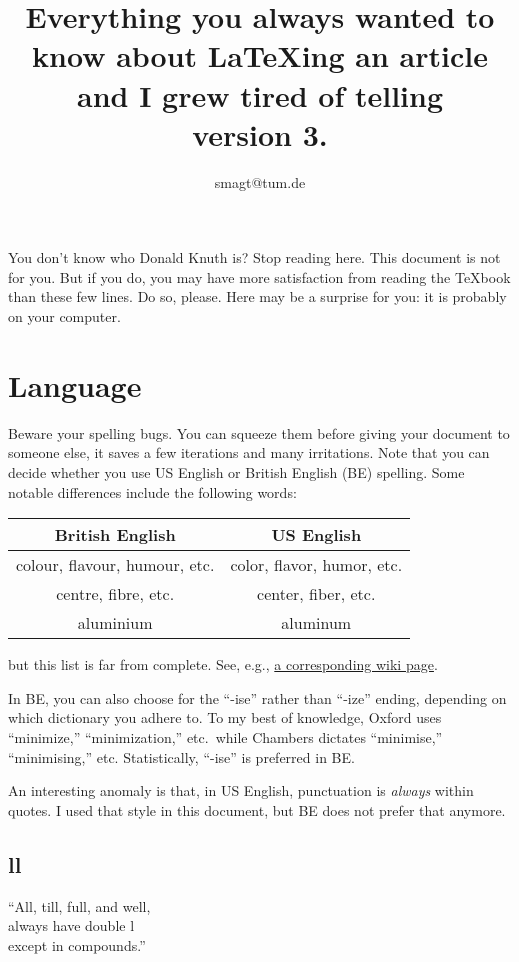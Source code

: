 \documentclass{article}
\title{Everything you always wanted to know about \LaTeX ing an article and I grew tired of telling\\[1ex]
\footnotesize{version 3.}}
\author{smagt@tum.de}
\begin{document}
\maketitle

You don't know who Donald Knuth is?  Stop reading here.  This document is not for you.  But if you do,
you may have more satisfaction from reading the \TeX book than these few lines.   Do so, please.
Here may be a surprise for you: it is probably on your computer.

\section{Language}
Beware your spelling bugs.  You can squeeze them before giving your document to someone else, it saves
a few iterations and many irritations.  Note that you can decide whether you use US English or
British English (BE) spelling.  Some notable differences include the following words:
\begin{center}\begin{tabular}{c|c}
British English & US English \\\hline
colour, flavour, humour, etc.	& color, flavor, humor, etc.\\
centre, fibre, etc.	& center, fiber, etc.\\
aluminium			& aluminum
\end{tabular}\end{center}
but this list is far from complete.  See, e.g., \href{http://en.wikipedia.org/wiki/American_and_British_English_spelling_differences}{a corresponding wiki page}.

In BE, you can also choose for the ``-ise'' rather than ``-ize'' ending, depending on which
dictionary you adhere to.  To my best of knowledge, Oxford uses ``minimize,'' ``minimization,'' etc.\
while Chambers dictates ``minimise,'' ``minimising,'' etc.  Statistically, ``-ise'' is preferred in BE.

An interesting anomaly is that, in US English, punctuation is \textsl{always} within quotes.  
I used that style in this document, but BE does not prefer that anymore.


\subsection{ll}
``All, till, full, and well, \\
always have double l\\
except in compounds.''
\end{document}
